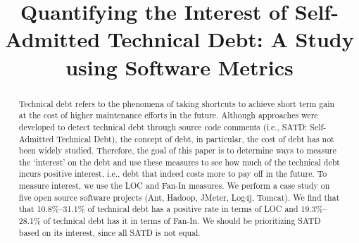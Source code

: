 \documentclass[10pt, conference]{IEEEtran}
\begin{document}
\title{Quantifying the Interest of Self-Admitted Technical Debt: A Study using Software Metrics}


\author{

\and
{}

\and
{}

\and
{}
}


\maketitle


\begin{abstract}
Technical debt refers to the phenomena of taking shortcuts to achieve short term gain at the cost of higher maintenance efforts in the future.
Although approaches were developed to detect technical debt through source code comments (i.e., SATD: Self-Admitted Technical Debt), 
the concept of debt, in particular, the cost of debt has not been widely studied.
Therefore, the goal of this paper is to determine ways to measure the ‘interest’ on the debt and use these measures to see how much of the technical debt incurs positive interest, i.e., debt that indeed costs more to pay off in the future. To measure interest, we use the LOC and Fan-In measures. We perform a case study on five open source software projects (Ant, Hadoop, JMeter, Log4j, Tomcat). 
We find that that 10.8\%--31.1\% of technical debt has a positive rate in terms of LOC and 19.3\%--28.1\% of technical debt has it in terms of Fan-In. We should be prioritizing SATD based on its interest, since all SATD is not equal.

\end{abstract}
\end{document}
